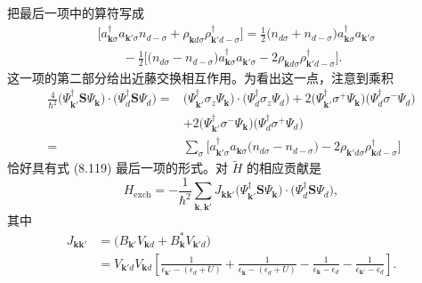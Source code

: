 把最后一项中的算符写成
\begin{equation*}
\begin{aligned}
& \big[ a_{\mathbf{k}\sigma}^{\dagger} a_{\mathbf{k}'\sigma} n_{d-\sigma} + \rho_{\mathbf{k}d\sigma} \rho_{\mathbf{k}'d-\sigma}^{\dagger} \big] = \frac{1}{2} \big( n_{d\sigma} + n_{d-\sigma} \big) a_{\mathbf{k}\sigma}^{\dagger} a_{\mathbf{k}'\sigma} \\
& \qquad - \frac{1}{2} \big[ \big( n_{d\sigma} - n_{d-\sigma} \big) a_{\mathbf{k}\sigma}^{\dagger} a_{\mathbf{k}'\sigma} - 2 \rho_{\mathbf{k}d\sigma} \rho_{\mathbf{k}'d-\sigma}^{\dagger} \big].
\end{aligned}
\tag{8.119}
\end{equation*}
这一项的第二部分给出近藤交换相互作用。为看出这一点，注意到乘积
\begin{align*}
\frac{4}{\hbar^{2}} \big( \Psi_{\mathbf{k}'}^{\dagger} \mathbf{S} \Psi_{\mathbf{k}} \big) \cdot \big( \Psi_{d}^{\dagger} \mathbf{S} \Psi_{d} \big) ={} & \big( \Psi_{\mathbf{k}'}^{\dagger} \sigma_{z} \Psi_{\mathbf{k}} \big) \cdot \big( \Psi_{d}^{\dagger} \sigma_{z} \Psi_{d} \big) + 2 \big( \Psi_{\mathbf{k}'}^{\dagger} \sigma^{+} \Psi_{\mathbf{k}} \big) \big( \Psi_{d}^{\dagger} \sigma^{-} \Psi_{d} \big) \\
& + 2 \big( \Psi_{\mathbf{k}'}^{\dagger} \sigma^{-} \Psi_{\mathbf{k}} \big) \big( \Psi_{d}^{\dagger} \sigma^{+} \Psi_{d} \big) \\
={}& \sum_{\sigma} \big[ a_{\mathbf{k}'\sigma}^{\dagger} a_{\mathbf{k}\sigma} \big( n_{d\sigma} - n_{d-\sigma} \big) - 2 \rho_{\mathbf{k}'d\sigma} \rho_{\mathbf{k}d-\sigma}^{\dagger} \big] \tag{8.120}
\end{align*}
恰好具有式 (8.119) 最后一项的形式。对 $\widetilde{H}$ 的相应贡献是
\begin{equation*}
H_{\mathrm{exch}} = -\frac{1}{\hbar^{2}} \sum_{\mathbf{k},\mathbf{k}'} J_{\mathbf{k}\mathbf{k}'} \big( \Psi_{\mathbf{k}'}^{\dagger} \mathbf{S} \Psi_{\mathbf{k}} \big) \cdot \big( \Psi_{d}^{\dagger} \mathbf{S} \Psi_{d} \big),
\tag{8.121}
\end{equation*}
其中
\begin{equation*}
\begin{aligned}
J_{\mathbf{k}\mathbf{k}'} &= \big( B_{\mathbf{k}'} V_{\mathbf{k}d} + B_{\mathbf{k}}^{*} V_{\mathbf{k}'d} \big) \\
&= V_{\mathbf{k}'d} V_{\mathbf{k}d} \left[ \frac{1}{\epsilon_{\mathbf{k}'} - (\epsilon_{d} + U)} + \frac{1}{\epsilon_{\mathbf{k}} - (\epsilon_{d} + U)} - \frac{1}{\epsilon_{\mathbf{k}} - \epsilon_{d}} - \frac{1}{\epsilon_{\mathbf{k}'} - \epsilon_{d}} \right].
\end{aligned}
\tag{8.122}
\end{equation*}

